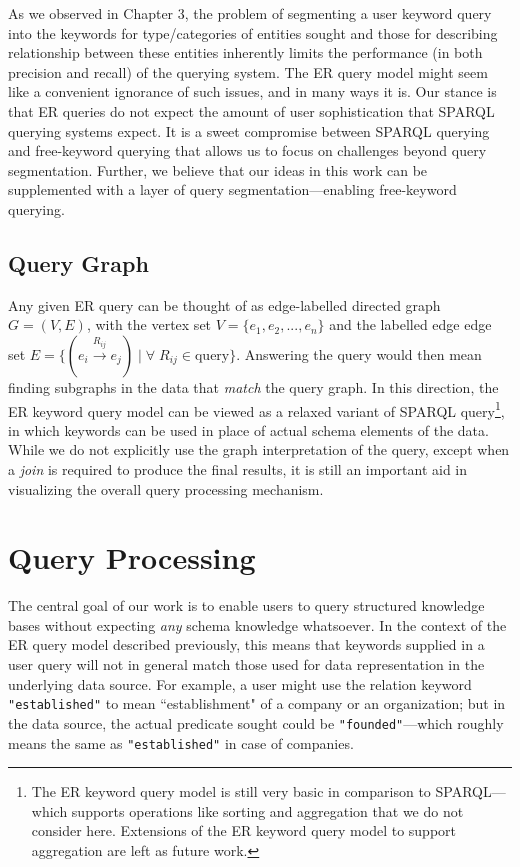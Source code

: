 \documentclass[a4paper, twoside, 12pt]{report}
\begin{document}
As we observed in Chapter 3, the problem of segmenting a user keyword query into the keywords for type/categories of entities sought and those for describing relationship between these entities inherently limits the performance (in both precision and recall) of the querying system. The ER query model might seem like a convenient ignorance of such issues, and in many ways it is. Our stance is that ER queries do not expect the amount of user sophistication that SPARQL querying systems expect. It is a sweet compromise between SPARQL querying and free-keyword querying that allows us to focus on challenges beyond query segmentation. Further, we believe that our ideas in this work can be supplemented with a layer of query segmentation---enabling free-keyword querying.

\subsection{Query Graph}
Any given ER query can be thought of as edge-labelled directed graph $G = (V, E)$, with the vertex set $V = \{e_1, e_2, ..., e_n\}$ and the
labelled edge edge set $E = \{(e_i \xrightarrow{R_{ij}} e_j) \; | \; \forall \; R_{ij} \in \text{query} \}$. Answering the query would then
mean finding subgraphs in the data that \emph{match} the query graph. In this direction, the ER keyword query model can be viewed as a
relaxed variant of SPARQL query\footnote{The ER keyword query model is still very basic in comparison to SPARQL---which supports operations like sorting and aggregation that we do not consider here. Extensions of the ER keyword query model to support aggregation are left as future work.}, in which keywords can be used in place of actual schema elements of the data. While we do not explicitly use the graph interpretation of the query, except when a \emph{join} is required to produce the final results, it is still an important aid in visualizing the overall query processing mechanism.

\section{Query Processing}

The central goal of our work is to enable users to query structured knowledge bases without expecting \emph{any} schema knowledge whatsoever. In the context of the ER query model described previously, this means that keywords supplied in a user query will not in general match those used for data representation in the underlying data source. For example, a user might use the relation keyword \texttt{"established"} to mean ``establishment" of a company or an organization; but in the data source, the actual predicate sought could be \texttt{"founded"}---which roughly means the same as \texttt{"established"} in case of companies.
\end{document}
